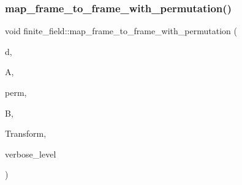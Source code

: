 \mbox{\label{classfinite__field_a6b6142cf5491507d40fa0b6c3a837b81}} 
\subsubsection{\texorpdfstring{map\+\_\+frame\+\_\+to\+\_\+frame\+\_\+with\+\_\+permutation()}{map\_frame\_to\_frame\_with\_permutation()}}
{\footnotesize\ttfamily void finite\+\_\+field\+::map\+\_\+frame\+\_\+to\+\_\+frame\+\_\+with\+\_\+permutation (\begin{DoxyParamCaption}\item[{\mbox{\hyperlink{galois_8h_a09fddde158a3a20bd2dcadb609de11dc}{I\+NT}}}]{d,  }\item[{\mbox{\hyperlink{galois_8h_a09fddde158a3a20bd2dcadb609de11dc}{I\+NT}} $\ast$}]{A,  }\item[{\mbox{\hyperlink{galois_8h_a09fddde158a3a20bd2dcadb609de11dc}{I\+NT}} $\ast$}]{perm,  }\item[{\mbox{\hyperlink{galois_8h_a09fddde158a3a20bd2dcadb609de11dc}{I\+NT}} $\ast$}]{B,  }\item[{\mbox{\hyperlink{galois_8h_a09fddde158a3a20bd2dcadb609de11dc}{I\+NT}} $\ast$}]{Transform,  }\item[{\mbox{\hyperlink{galois_8h_a09fddde158a3a20bd2dcadb609de11dc}{I\+NT}}}]{verbose\+\_\+level }\end{DoxyParamCaption})}

\mbox{\label{classfinite__field_a6ebf38250033b090baa12391d9a9cd98}} 
